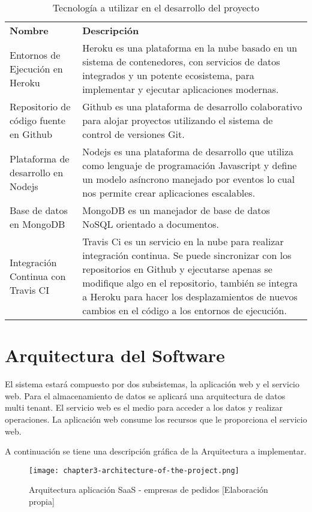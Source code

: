 \begin{table}[H]
	\centering
    \begin{tabular}{ |P{4cm}|p{10cm}| }
	  \hline
	    \\
	  \hline
	   \textbf{Nombre} & \centering \textbf{Descripción}
	  \tabularnewline \hline
	  Entornos de Ejecución en Heroku & Heroku es una plataforma en la nube basado en un sistema de contenedores, con servicios de datos integrados y un potente ecosistema, para implementar y ejecutar aplicaciones modernas.
	  \tabularnewline \hline
	  Repositorio de código fuente en Github & Github es una plataforma de desarrollo colaborativo para alojar proyectos utilizando el sistema de control de versiones Git. 
	  \tabularnewline \hline
	  Plataforma de desarrollo en Nodejs & Nodejs es una plataforma de desarrollo que utiliza como lenguaje de programación Javascript y define un modelo asíncrono manejado por eventos lo cual nos permite crear aplicaciones escalables. 
	  \tabularnewline \hline
	  Base de datos en MongoDB & MongoDB es un manejador de base de datos NoSQL orientado a documentos. 
	  \tabularnewline \hline
	Integración Continua con Travis CI & Travis Ci es un servicio en la nube para realizar integración continua. Se puede sincronizar con los repositorios en Github  y ejecutarse apenas se modifique algo en el repositorio, también se integra a Heroku para hacer los desplazamientos de nuevos cambios en el código a los entornos de ejecución. 
	  \tabularnewline \hline
	\end{tabular}
	\caption{Tecnología a utilizar en el desarrollo del proyecto}
\end{table}

\section{Arquitectura del Software}
\noindent El sistema estará compuesto por dos subsistemas, la aplicación web y el servicio web. Para el almacenamiento de datos se aplicará una arquitectura de datos multi tenant. El servicio web es el medio para acceder a los datos y realizar operaciones. La aplicación web consume los recursos que le proporciona el servicio web.

\noindent A continuación se tiene una descripción gráfica de la Arquitectura a implementar. 
\begin{figure}[H]
  \centering
  \texttt{[image: chapter3-architecture-of-the-project.png]}
  \caption{Arquitectura aplicación SaaS - empresas de pedidos [Elaboración propia]}  
\end{figure}
   
